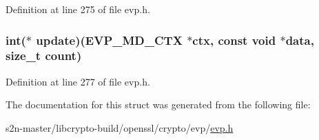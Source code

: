 Definition at line 275 of file evp.\+h.

\subsubsection[{\texorpdfstring{update}{update}}]{\setlength{\rightskip}{0pt plus 5cm}int($\ast$ update)({\bf E\+V\+P\+\_\+\+M\+D\+\_\+\+C\+TX} $\ast$ctx, const {\bf void} $\ast$data, size\+\_\+t count)}\hypertarget{structenv__md__ctx__st_a72478f17745f90449c81abc3cacd1eef}{}\label{structenv__md__ctx__st_a72478f17745f90449c81abc3cacd1eef}


Definition at line 277 of file evp.\+h.



The documentation for this struct was generated from the following file\+:\begin{DoxyCompactItemize}
\item 
s2n-\/master/libcrypto-\/build/openssl/crypto/evp/\hyperlink{crypto_2evp_2evp_8h}{evp.\+h}\end{DoxyCompactItemize}

